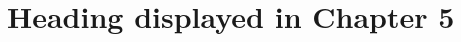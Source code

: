 \chapter[\leavevmode\newline Heading of Chapter 5 to show in TOC]{Heading displayed in  Chapter 5}
\label{chap:Chapter_5}
\lipsum[5]